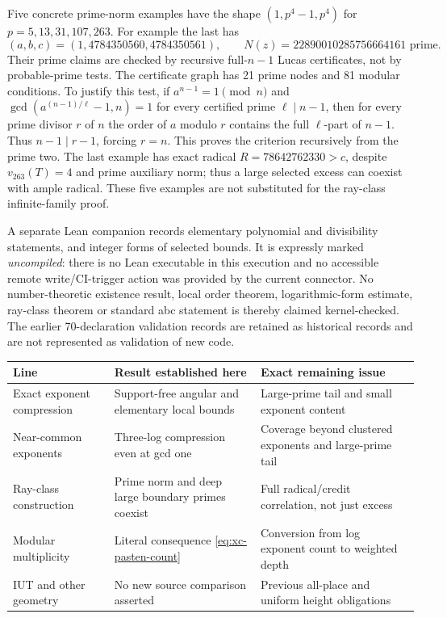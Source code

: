 Five concrete prime-norm examples have the shape
$(1,p^4-1,p^4)$ for $p=5,13,31,107,263$.
For example the last has
\[
 (a,b,c)=(1,4784350560,4784350561),\qquad
 N(z)=22890010285756664161\text{ prime}.
\]
Their prime claims are checked by recursive full-$n-1$ Lucas certificates,
not by probable-prime tests. The certificate graph has 21 prime nodes and
81 modular conditions. To justify this test, if $a^{n-1}=1\pmod n$ and
$\gcd(a^{(n-1)/\ell}-1,n)=1$ for every certified prime $\ell\mid n-1$,
then for every prime divisor $r$ of $n$ the order of $a$ modulo $r$ contains
the full $\ell$-part of $n-1$. Thus $n-1\mid r-1$, forcing $r=n$.
This proves the criterion recursively from the prime two. The last example
has exact radical $R=78642762330>c$, despite $v_{263}(T)=4$ and prime
auxiliary norm; thus a large selected excess can coexist with ample radical.
These five
examples are not substituted for the ray-class infinite-family proof.

A separate Lean companion records elementary polynomial and divisibility
statements, and integer forms of selected bounds. It is expressly marked \emph{uncompiled}:
there is no Lean executable in this execution and no accessible remote
write/CI-trigger action was provided by the current connector.
No number-theoretic existence result, local order theorem, logarithmic-form
estimate, ray-class theorem or standard abc statement is thereby claimed
kernel-checked. The earlier 70-declaration validation records are retained
as historical records and are not represented as validation of new code.

\begin{center}\small
\begin{tabular}{p{.21\linewidth}p{.34\linewidth}p{.37\linewidth}}
\toprule
Line & Result established here & Exact remaining issue\\\midrule
Exact exponent compression & Support-free angular and elementary local bounds
& Large-prime tail and small exponent content\\
Near-common exponents & Three-log compression even at gcd one
& Coverage beyond clustered exponents and large-prime tail\\
Ray-class construction & Prime norm and deep large boundary primes coexist
& Full radical/credit correlation, not just excess\\
Modular multiplicity & Literal consequence \eqref{eq:xc-pasten-count}
& Conversion from log exponent count to weighted depth\\
IUT and other geometry & No new source comparison asserted
& Previous all-place and uniform height obligations\\
\bottomrule
\end{tabular}
\end{center}

